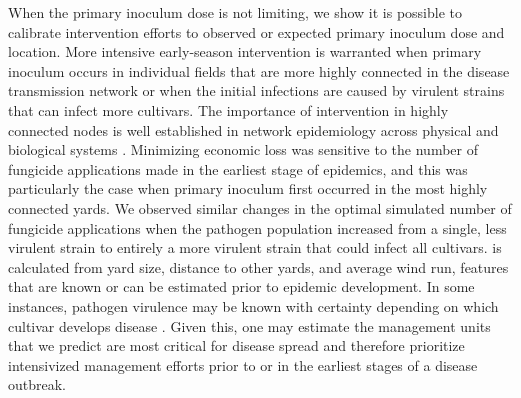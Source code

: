 \documentclass[10pt,a4paper]{article}
\begin{document}
When the primary inoculum dose is not limiting, we show it is possible to calibrate intervention efforts to observed or expected primary inoculum dose and location. More intensive early-season intervention is warranted when primary inoculum occurs in individual fields that are more highly connected in the disease transmission network or when the initial infections are caused by virulent strains that can infect more cultivars. The importance of intervention in highly connected nodes is well established in network epidemiology across physical and biological systems \parencite{Pastor-Satorras2001, Cross2005}. Minimizing economic loss was sensitive to the number of fungicide applications made in the earliest stage of epidemics, and this was particularly the case when primary inoculum first occurred in the most highly connected yards.  We observed similar changes in the optimal simulated number of fungicide applications when the pathogen population increased from a single, less virulent strain to entirely a more virulent strain that could infect all cultivars.   is calculated from yard size, distance to other yards, and average wind run, features that are known or can be estimated prior to epidemic development. In some instances, pathogen virulence may be known with certainty depending on which cultivar develops disease \parencite{Gent2019}. Given this, one may estimate the management units that we predict are most critical for disease spread and therefore prioritize intensivized management efforts prior to or in the earliest stages of a disease outbreak.
\end{document}
